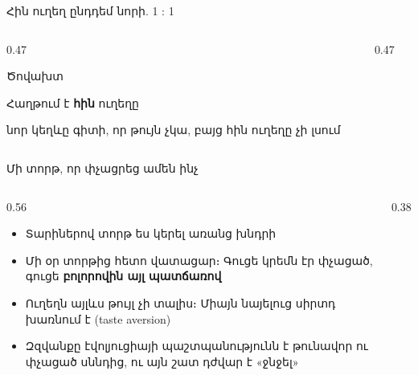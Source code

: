 \begin{frame}{Հին ուղեղ ընդդեմ նորի. 1 : 1}
  \begin{columns}[T]
    \begin{column}{0.47\textwidth}
      \begin{card}[colback=mint!35!cardwhite]
        \centering
        \par\smallskip
        {\blackfont\large Ծովախտ}\par\smallskip
        Հաղթում է \textbf{հին} ուղեղը \par
        նոր կեղևը գիտի, որ թույն չկա, բայց հին ուղեղը չի լսում
      \end{card}
    \end{column}
    \begin{column}{0.47\textwidth}
    \end{column}
  \end{columns}
  \vspace{4mm}
\end{frame}

\begin{frame}{Մի տորթ, որ փչացրեց ամեն ինչ}
  \begin{columns}[c]
    \begin{column}{0.56\textwidth}
      \begin{itemize}
        \item Տարիներով տորթ ես կերել առանց խնդրի
        \item<2-> Մի օր տորթից հետո վատացար։ Գուցե կրեմն էր փչացած, գուցե \textbf{բոլորովին այլ պատճառով}
        \item<3-> Ուղեղն այլևս թույլ չի տալիս։ Միայն նայելուց սիրտդ խառնում է (taste aversion)
        \item<4-> Զզվանքը էվոլյուցիայի պաշտպանությունն է թունավոր ու փչացած սննդից, ու այն շատ դժվար է «ջնջել»
      \end{itemize}
    \end{column}
    \begin{column}{0.38\textwidth}
      \centering
      \ \raisebox{0.4cm}{\Large$\rightarrow$}\ \par\medskip
    \end{column}
  \end{columns}
\end{frame}

